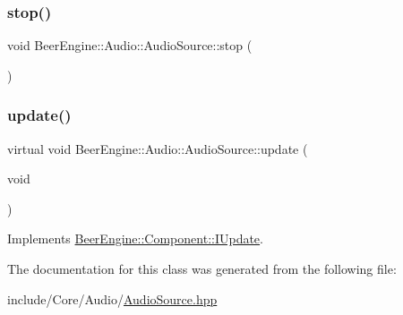 \subsubsection{\texorpdfstring{stop()}{stop()}}
{\footnotesize\ttfamily void Beer\+Engine\+::\+Audio\+::\+Audio\+Source\+::stop (\begin{DoxyParamCaption}{ }\end{DoxyParamCaption})}

\mbox{\label{class_beer_engine_1_1_audio_1_1_audio_source_aaf476320ad96ecb33951f349f5112c54}} 
\subsubsection{\texorpdfstring{update()}{update()}}
{\footnotesize\ttfamily virtual void Beer\+Engine\+::\+Audio\+::\+Audio\+Source\+::update (\begin{DoxyParamCaption}\item[{void}]{ }\end{DoxyParamCaption})\hspace{0.3cm}{\ttfamily [virtual]}}



Implements \mbox{\hyperlink{class_beer_engine_1_1_component_1_1_i_update_aeeda0aa303175720e449b4c51d9867dd}{Beer\+Engine\+::\+Component\+::\+I\+Update}}.



The documentation for this class was generated from the following file\+:\begin{DoxyCompactItemize}
\item 
include/\+Core/\+Audio/\mbox{\hyperlink{_audio_source_8hpp}{Audio\+Source.\+hpp}}\end{DoxyCompactItemize}
